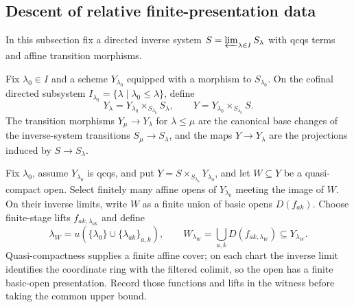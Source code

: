 \subsection{Descent of relative finite-presentation data}

In this subsection fix a directed inverse system
$S=\varprojlim_{\lambda\in I}S_\lambda$ with qcqs terms and affine
transition morphisms.

\begin{definition}
  \label{def:nagata-basechanged-system}

  Fix $\lambda_0\in I$ and a scheme $Y_{\lambda_0}$ equipped with a morphism
  to $S_{\lambda_0}$.  On the cofinal directed subsystem
  $I_{\lambda_0}=\{\lambda\mid\lambda_0\leq\lambda\}$, define
  \[
    Y_\lambda=Y_{\lambda_0}\times_{S_{\lambda_0}}S_\lambda,
    \qquad
    Y=Y_{\lambda_0}\times_{S_{\lambda_0}}S.
  \]
  The transition morphisms $Y_\mu\to Y_\lambda$ for
  $\lambda\leq\mu$ are the canonical base changes of the inverse-system
  transitions $S_\mu\to S_\lambda$, and the maps $Y\to Y_\lambda$ are the
  projections induced by $S\to S_\lambda$.
\end{definition}

\begin{definition}
  \label{def:nagata-qc-open-descent}

  Fix $\lambda_0$, assume $Y_{\lambda_0}$ is qcqs, and put
  $Y=S\times_{S_{\lambda_0}}Y_{\lambda_0}$, and let $W\subseteq Y$ be a
  quasi-compact open.  Select finitely many affine opens of
  $Y_{\lambda_0}$ meeting the image of $W$.  On their inverse limits, write
  $W$ as a finite union of basic opens $D(f_{ak})$.  Choose finite-stage
  lifts $f_{ak,\lambda_{ak}}$ and define
  \[
    \lambda_W=u(\{\lambda_0\}\cup\{\lambda_{ak}\}_{a,k}),
    \qquad
    W_{\lambda_W}=\bigcup_{a,k}D(f_{ak,\lambda_W})
      \subseteq Y_{\lambda_W}.
  \]
  Quasi-compactness supplies a finite affine cover; on each chart the inverse
  limit identifies the coordinate ring with the filtered colimit, so the open
  has a finite basic-open presentation. Record those functions and lifts in
  the witness before taking the common upper bound.
\end{definition}


